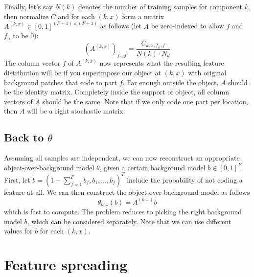 \documentclass{article}
\begin{document}
Finally, let's say $N(k)$ denotes the number of training samples for component $k$, then normalize $C$ and for each $(k,x)$ form a matrix $A^{(k,x)} \in [0, 1]^{(F+1) \times (F+1)}$ as follows (let $A$ be zero-indexed to allow $f$ and $f_n$ to be 0):
\[
    (A^{(k,x)})_{f_n,f} = \frac{C_{k,x,f_n,f}}{N(k) \cdot N_d}
\]
The column vector $f$ of $A^{(k,x)}$ now represents what the resulting feature distribution will be if you superimpose our object at $(k,x)$ with original background patches that code to part $f$. Far enough outside the object, $A$ should be the identity matrix. Completely inside the support of object, all column vectors of $A$ should be the same. Note that if we only code one part per location, then $A$ will be a right stochastic matrix.


\subsection{Back to $\theta$}
Assuming all samples are independent, we can now reconstruct an appropriate object-over-background model $\theta$, given a certain background model $b \in [0, 1]^F$. First, let $\tilde b = (1 - \sum_{f=1}^F b_f, b_1, \dots, b_f)^T$ include the probability of not coding a feature at all. We can then construct the object-over-background model as follows
\[
    \theta_{k,x}(b) = A^{(k,x)} \tilde b
\]
which is fast to compute. The problem reduces to picking the right background model $b$, which can be considered separately. Note that we can use different values for $b$ for each $(k,x)$. 


\section{Feature spreading}
\newcommand{\neigh}[1]{\text{Ne}(#1)}
\newcommand{\Ne}{\text{Ne}}
\newcommand{\spr}[1]{#1^{\text{(spr)}}}
\newcommand{\raw}[1]{#1^{\text{(raw)}}}
\end{document}
